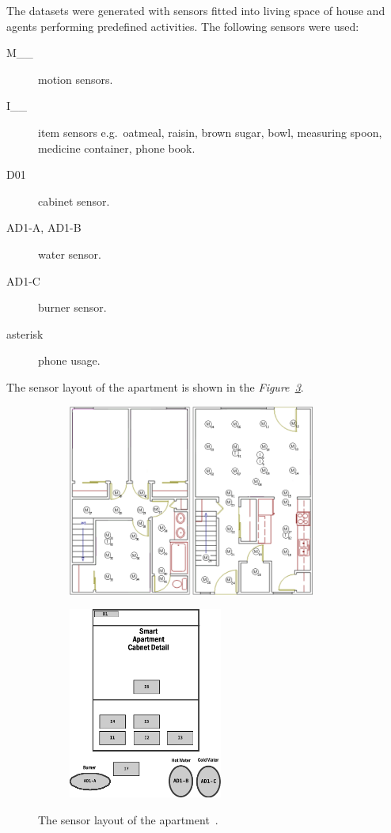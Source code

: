 \documentclass[12pt, a4paper, pdflatex, leqno, twoside, openright]{report}
\begin{document}
The datasets were generated with sensors fitted into living space of house and agents performing predefined activities. The following sensors were used:
\begin{description}
\item[M\_\_] motion sensors.
\item[I\_\_] item sensors e.g.\ oatmeal, raisin, brown sugar, bowl, measuring spoon, medicine container, phone book.
\item[D01] cabinet sensor.
\item[AD1-A, AD1-B] water sensor.
\item[AD1-C] burner sensor.
\item[asterisk] phone usage.
\end{description}

The sensor layout of the apartment is shown in the \emph{Figure~\ref{fig:house}}.

\begin{figure}[htb]
  \centering%
  \begin{subfigure}[b]{0.6\textwidth}
    \includegraphics[height=6.3cm]{gfx/Chinook_3_Bedroom_TH}
    \caption{\label{fig:house:a}}
  \end{subfigure}%
  \begin{subfigure}[b]{0.3\textwidth}
    \includegraphics[height=6.3cm]{gfx/Chinook_Cabinet}
    \caption{\label{fig:house:b}}
  \end{subfigure}%
  \caption[The sensor layout of the apartment.]{The sensor layout of the apartment~\citep{cook2009assessing}.\label{fig:house}}
\end{figure}
\end{document}
